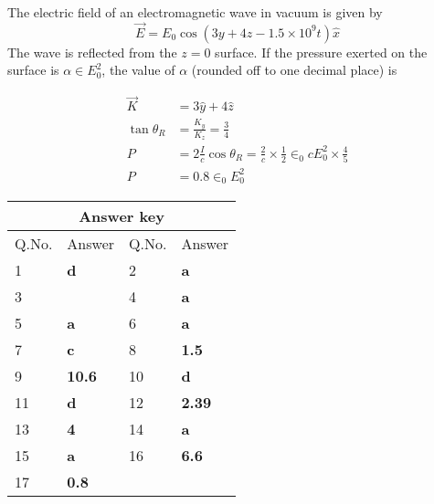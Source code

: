 \begin{enumerate}
\begin{answer}
\end{answer}
	\begin{minipage}{\textwidth}
		\item The electric field of an electromagnetic wave in vacuum is given by
		$$
		\vec{E}=E_{0} \cos \left(3 y+4 z-1.5 \times 10^{9} t\right) \hat{x}
		$$
		The wave is reflected from the $z=0$ surface. If the pressure exerted on the surface is $\alpha \in E_{0}^{2}$, the value of $\alpha$ (rounded off to one decimal place) is
	\end{minipage}
\begin{answer}
	\begin{align*}
	\vec{K}&=3 \hat{y}+4 \hat{z}\\
	\tan \theta_{R}&=\frac{K_{y}}{K_{z}}=\frac{3}{4}\\
	P&=2 \frac{I}{c} \cos \theta_{R}=\frac{2}{c} \times \frac{1}{2} \in_{0} c E_{0}^{2} \times \frac{4}{5}\\
	P&=0.8 \in_{0} E_{0}^{2}
	\end{align*}
\end{answer}
\end{enumerate}

\setlength\arrayrulewidth{1pt}
\begin{table}[H]
	\centering
	
	\begin{tabular}{|p{1.5cm}|p{1.5cm}||p{1.5cm}|p{1.5cm}|}
		\hline
		\multicolumn{4}{|c|}{\textbf{Answer key}}\\\hline\hline
		\rowcolor{ocrel}Q.No.&Answer&Q.No.&Answer\\\hline
		1&\textbf{d}&2&\textbf{a}\\\hline
		3&\textbf{}&4&\textbf{a}\\\hline
		5&\textbf{a}&6&\textbf{a}\\\hline
		7&\textbf{c}&8&\textbf{1.5}\\\hline
		9&\textbf{10.6}&10&\textbf{d}\\\hline
		11&\textbf{d}&12&\textbf{2.39}\\\hline
		13&\textbf{4}&14&\textbf{a}\\\hline
		15&\textbf{a}&16&\textbf{6.6}\\\hline
		17&\textbf{0.8}&&\\\hline
	\end{tabular}
\end{table}